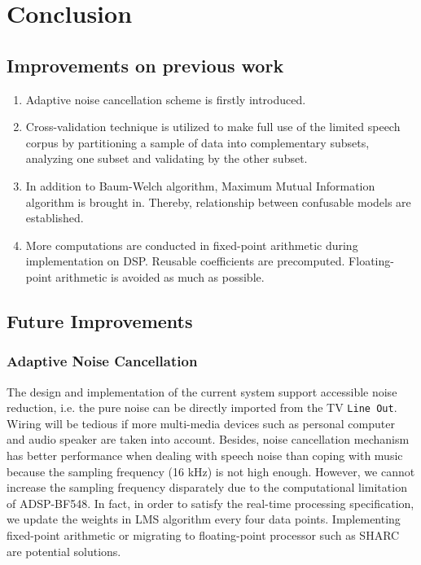 \chapter{Conclusion}
\label{chapter:conclusion}


\section{Improvements on previous work}

\begin{enumerate}
\item Adaptive noise cancellation scheme is firstly introduced.
\item Cross-validation technique is utilized to make full use of the limited speech corpus by partitioning a sample of data into complementary subsets, analyzing one subset and validating by the other subset.
\item In addition to Baum-Welch algorithm, Maximum Mutual Information algorithm is brought in. Thereby, relationship between confusable models are established.
\item More computations are conducted in fixed-point arithmetic during implementation on DSP. Reusable coefficients are precomputed. Floating-point arithmetic is avoided as much as possible.
\end{enumerate}


\section{Future Improvements}

\subsection{Adaptive Noise Cancellation}

The design and implementation of the current system support accessible noise reduction, i.e. the pure noise can be directly imported from the TV \texttt{Line Out}. Wiring will be tedious if more multi-media devices such as personal computer and audio speaker are taken into account. Besides, noise cancellation mechanism has better performance when dealing with speech noise than coping with music because the sampling frequency (16 kHz) is not high enough. However, we cannot increase the sampling frequency disparately due to the computational limitation of ADSP-BF548. In fact, in order to satisfy the real-time processing specification, we update the weights in LMS algorithm every four data points. Implementing fixed-point arithmetic or migrating to floating-point processor such as SHARC\textsuperscript{\textregistered} are potential solutions.


